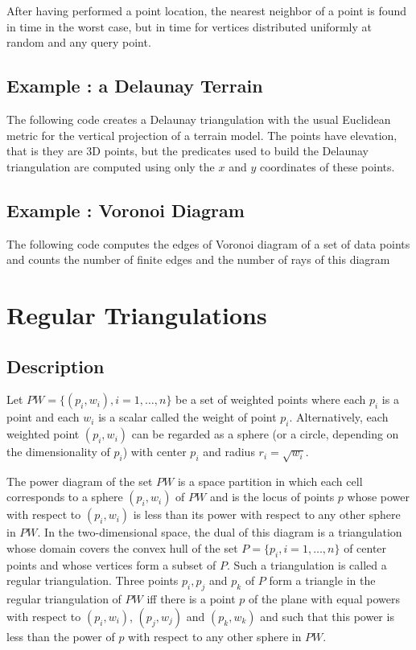After having performed a  point location, the
nearest neighbor of a point is found in time  in the
worst case, but in time 
for vertices distributed uniformly at random  and any query point. 


\subsection{Example : a Delaunay Terrain\label{Subsection_2D_Triangulations_Delaunay_Terrain}}

The following code  creates a Delaunay triangulation with 
the usual Euclidean metric for the vertical projection of a 
terrain model. The points have elevation, that is they are 3D points,
but the predicates used to build the  Delaunay triangulation
are computed using only  the $x$ and $y$ coordinates  
of these points. 

\subsection{Example : Voronoi Diagram\label{Subsection_2D_Triangulations_Voronoi}}
The following code computes the edges of Voronoi diagram
of a set of data points
and counts  the number of finite edges and the number of rays
of this diagram


\section{Regular Triangulations\label{Section_2D_Triangulations_Regular}}

\subsection{Description\label{Subsection_2D_Triangulations_Regular_Description}}
Let ${  PW} = \{(p_i, w_i), i = 1, \ldots , n \}$ be a set of 
weighted points where each $p_i$ is a point and each $w_i$
is a scalar called the weight of point $p_i$.
Alternatively, each weighted point $(p_i, w_i)$ can be regarded
as a sphere (or a circle, depending on the dimensionality
of $p_i$)  with center $p_i$ and radius $r_i=\sqrt{w_i}$.

The power diagram of the set ${  PW}$ is a space partition in which
 each cell corresponds to a sphere $(p_i, w_i)$ of ${  PW}$
and is the locus of points  $p$ whose power with respect to $(p_i, w_i)$
is less than its power with respect to any other sphere 
in ${  PW}$. In the two-dimensional space,
the dual of this diagram is a triangulation 
whose domain covers the convex hull of the set 
${  P}= \{ p_i, i = 1, \ldots , n \}$ of center points
and whose vertices form a subset of ${  P}$.
Such a triangulation is called a regular triangulation.
Three points $p_i, p_j$ and $p_k$ of ${  P}$
form a triangle in the regular triangulation of ${  PW}$
iff there is a point $p$ of the plane with equal 
powers with respect to $(p_i, w_i)$, $(p_j, w_j)$
and $(p_k, w_k)$ and such that this power 
is  less than the power of $p$
with respect to any other sphere in  ${  PW}$.


